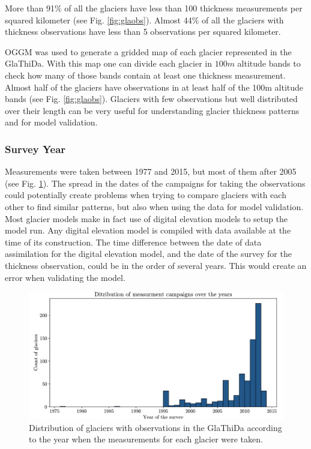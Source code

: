 More than 91\% of all the glaciers have less than 100 thickness measurements per squared kilometer (see Fig. \ref{fig:glaobs}). Almost 44\% of all the glaciers with thickness observations have less than 5 observations per squared kilometer.

OGGM was used to generate a gridded map of each glacier represented in the GlaThiDa. With this map one can divide each glacier in $100m$ altitude bands to check how many of those bands contain at least one thickness measurement.
Almost half of the glaciers have observations in at least half of the 100m altitude bands (see Fig. \ref{fig:glaobs}). Glaciers with few observations but well distributed over their length can be very useful for understanding glacier thickness patterns and for model validation.

\subsubsection{Survey Year}\label{survey-year}
Measurements were taken between 1977 and 2015, but most of them after 2005 (see Fig. \ref{fig:glayears}). The spread in the dates of the campaigns for taking the observations could potentially create problems when trying to compare glaciers with each other to find similar patterns, but also when using the data for model validation.
Most glacier models make in fact use of digital elevation models to setup the model run. Any digital elevation model is compiled with data available at the time of its construction. The time difference between the date of data assimilation for the digital elevation model, and the date of the survey for the thickness observation, could be in the order of several years. This would create an error when validating the model.
\begin{figure}[!tp]
	\centering		  
	\includegraphics[width=1.\textwidth]{figures/Observations_per_year.pdf}
	\caption{Distribution of glaciers with observations in the GlaThiDa according to the year when the measurements for each glacier were taken.}
	\label{fig:glayears}
\end{figure}


